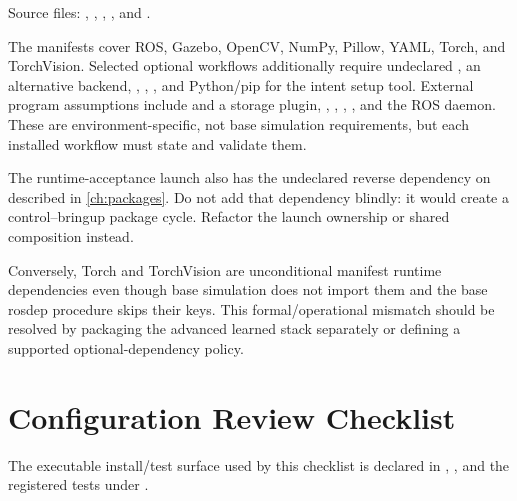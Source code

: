 Source files: ,
,
,
, and
.

The manifests cover ROS, Gazebo, OpenCV, NumPy, Pillow, YAML, Torch, and
TorchVision. Selected optional workflows additionally require undeclared
, an alternative  backend,
, , , and Python/pip for
the intent setup tool. External program assumptions include 
and a storage plugin, , , , ,
and the ROS daemon. These are environment-specific, not base simulation
requirements, but each installed workflow must state and validate them.

The runtime-acceptance launch also has the undeclared reverse dependency on
 described in \cref{ch:packages}. Do not add that
dependency blindly: it would create a control--bringup package cycle. Refactor
the launch ownership or shared composition instead.

Conversely, Torch and TorchVision are unconditional manifest runtime
dependencies even though base simulation does not import them and the base
rosdep procedure skips their keys. This formal/operational mismatch should be
resolved by packaging the advanced learned stack separately or defining a
supported optional-dependency policy.

\section{Configuration Review Checklist}

The executable install/test surface used by this checklist is declared in
,
, and the registered tests under
.

